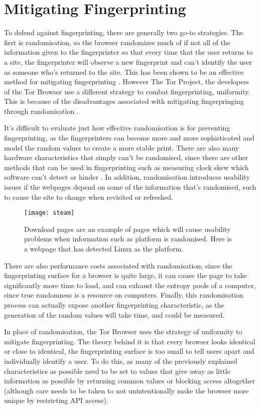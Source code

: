 \chapter{Mitigating Fingerprinting}

To defend against fingerprinting, there are generally two go-to strategies.
The first is randomisation, so the browser randomizes much of if not all of the information given to the fingerprinter so that every time that the user returns to a site, the fingerprinter will observe a new fingerprint and can't identify the user as someone who's returned to the site.
This has been shown to be an effective method for mitigating fingerprinting \citep{privaricator}.
However The Tor Project, the developers of the Tor Browser use a different strategy to combat fingerprinting, uniformity.
This is because of the disadvantages associated with mitigating fingerpringing through randomisation \citep{tor-project}.

It's difficult to evaluate just how effective randomisation is for preventing fingerprinting, as the fingerprinters can become more and more sophisticated and model the random values to create a more stable print.
There are also many hardware characteristics that simply can't be randomised, since there are other methods that can be used in fingerprinting such as measuring clock skew which software can't detect or hinder \citep{skew}.
In addition, randomisation introduces usability issues if the webpages depend on some of the information that's randomised, such to cause the site to change when revisited or refreshed.

\begin{figure}[h]
\caption{Download pages are an example of pages which will cause usability problems when information such as platform is randomised. Here is a webpage that has detected Linux as the platform.}
\texttt{[image: steam]}
\centering
\label{fig:steam}
\end{figure}

There are also performance costs associated with randomisation; since the fingerprinting surface for a browser is quite large, it can cause the page to take significantly more time to load, and can exhaust the entropy pools of a computer, since true randomness is a resource on computers.
Finally, this randomisation process can actually expose another fingerprinting characteristic, as the generation of the random values will take time, and could be measured.

In place of randomisation, the Tor Browser uses the strategy of uniformity to mitigate fingerprinting.
The theory behind it is that every browser looks identical or close to identical, the fingerprinting surface is too small to tell users apart and individually identify a user.
To do this, as many of the previously explained characteristics as possible need to be set to values that give away as little information as possible by returning common values or blocking access altogether (although care needs to be taken to not unintentionally make the browser more unique by restricting API access).

